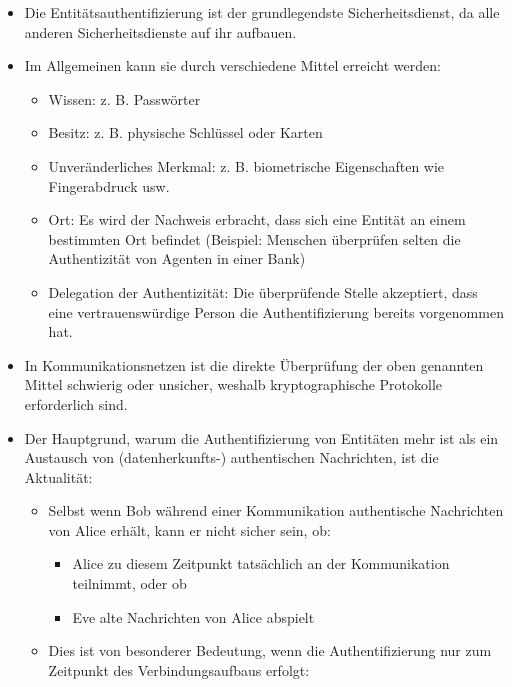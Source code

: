 \documentclass[a4paper]{article}
\begin{document}
\begin{multicols}{3}
    \begin{itemize}
        \item
              Die Entitätsauthentifizierung ist der grundlegendste
              Sicherheitsdienst, da alle anderen Sicherheitsdienste auf ihr
              aufbauen.
        \item
              Im Allgemeinen kann sie durch verschiedene Mittel erreicht werden:

              \begin{itemize}
                  \item
                        Wissen: z. B. Passwörter
                  \item
                        Besitz: z. B. physische Schlüssel oder Karten
                  \item
                        Unveränderliches Merkmal: z. B. biometrische Eigenschaften wie
                        Fingerabdruck usw.
                  \item
                        Ort: Es wird der Nachweis erbracht, dass sich eine Entität an einem
                        bestimmten Ort befindet (Beispiel: Menschen überprüfen selten die
                        Authentizität von Agenten in einer Bank)
                  \item
                        Delegation der Authentizität: Die überprüfende Stelle akzeptiert,
                        dass eine vertrauenswürdige Person die Authentifizierung bereits
                        vorgenommen hat.
              \end{itemize}
        \item
              In Kommunikationsnetzen ist die direkte Überprüfung der oben genannten
              Mittel schwierig oder unsicher, weshalb kryptographische Protokolle
              erforderlich sind.
        \item
              Der Hauptgrund, warum die Authentifizierung von Entitäten mehr ist als
              ein Austausch von (datenherkunfts-) authentischen Nachrichten, ist die
              Aktualität:

              \begin{itemize}
                  \item
                        Selbst wenn Bob während einer Kommunikation authentische Nachrichten
                        von Alice erhält, kann er nicht sicher sein, ob:

                        \begin{itemize}
                            \item
                                  Alice zu diesem Zeitpunkt tatsächlich an der Kommunikation
                                  teilnimmt, oder ob
                            \item
                                  Eve alte Nachrichten von Alice abspielt
                        \end{itemize}
                  \item
                        Dies ist von besonderer Bedeutung, wenn die Authentifizierung nur
                        zum Zeitpunkt des Verbindungsaufbaus erfolgt:


\end{itemize}
\end{itemize}
\end{multicols}
\end{document}

